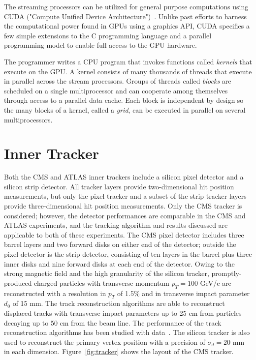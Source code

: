 \documentclass{JINST}
\begin{document}
The streaming processors can be utilized for general purpose computations using
CUDA ("Compute Unified Device Architecture")~\cite{bib:CUDA}.  Unlike past efforts to harness
the computational power found in GPUs using a graphics API, CUDA specifies a
few simple extensions to the C programming language and a parallel programming
model to enable full access to the GPU hardware.

The programmer writes a CPU program that invokes functions called {\it kernels}
that execute on the GPU.  A kernel consists of many thousands of threads that
execute in parallel across the stream processors.  Groups of threads called
{\it blocks} are scheduled on a single multiprocessor and can cooperate among
themselves through access to a parallel data cache.  Each block is independent
by design so the many blocks of a kernel, called a {\it grid}, can be executed
in parallel on several multiprocessors.

\section{Inner Tracker}

Both the CMS and ATLAS inner trackers include a silicon pixel detector and a silicon strip detector.
All tracker layers provide two-dimensional hit position measurements, but only the pixel tracker
 and a subset of the strip tracker layers provide three-dimensional hit position measurements.
Only the CMS tracker is considered; however, the detector performances are comparable
in the CMS and ATLAS experiments, and the tracking algorithm and results discussed are applicable to both of 
these experiments. The CMS pixel detector includes three barrel layers and two forward disks
on either end of the detector; outside the pixel detector is the strip detector, consisting of ten layers in the barrel plus three 
inner disks and nine forward disks at each end of the detector.
Owing to the strong magnetic field and the high granularity of the silicon tracker, 
promptly-produced charged particles with transverse momentum $p_T = 100$ GeV/c are reconstructed 
with a resolution in $p_T$ of 1.5\% and in transverse impact
parameter $d_0$ of 15 mm. The track reconstruction algorithms are able to reconstruct displaced
tracks with transverse impact parameters up to 25 cm from particles decaying up to 50 cm
from the beam line. The performance of the track reconstruction algorithms has been studied
with data~\cite{Khachatryan:2010pw}. The silicon tracker is also used to reconstruct the primary vertex position with
 a precision of $\sigma_d = 20$ mm in each dimension. Figure~\ref{fig:tracker} shows the layout of the CMS tracker.
\end{document}
